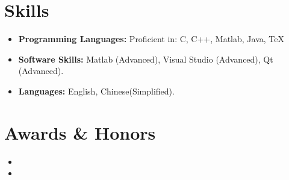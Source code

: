 \documentclass[11pt,a4paper,sans]{moderncv}        %
\begin{document}
\section{Skills}

\vspace{6pt}

\begin{itemize}

\item \textbf{Programming Languages:} Proficient in: C, C++, Matlab, Java, TeX 

\vspace{6pt}

\item \textbf{Software Skills:}  Matlab (Advanced), Visual Studio (Advanced),  Qt (Advanced). 

\vspace{6pt}

\item \textbf{Languages:} English, Chinese(Simplified).


\end{itemize}


\section{Awards \& Honors}

\vspace{6pt}
 
\begin{itemize}

\item{}
\vspace{6pt}
\item{}
\end{itemize}



\end{document}
